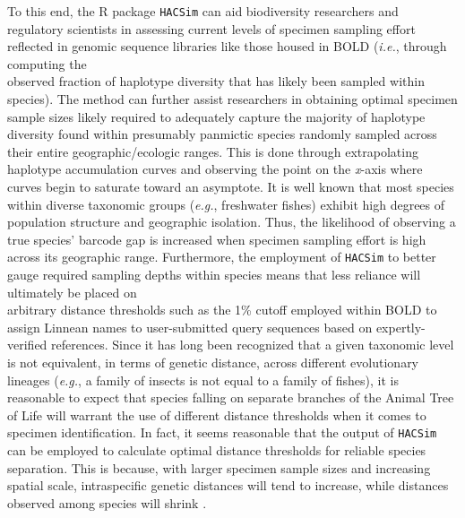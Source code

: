 To this end, the R package {\tt HACSim} \cite{phillips2020hacsim} can aid biodiversity researchers and \\ regulatory scientists in assessing current levels of specimen sampling effort reflected in genomic sequence libraries like those housed in BOLD (\textit{i.e.}, through computing the \\ observed fraction of haplotype diversity that has likely been sampled within species). The method can further assist researchers in obtaining optimal specimen sample sizes likely required to adequately capture the majority of haplotype diversity found within presumably panmictic species randomly sampled across their entire geographic/ecologic ranges. This is done through extrapolating haplotype accumulation curves and observing the point on the \textit{x}-axis where curves begin to saturate toward an asymptote. It is well known that most species within diverse taxonomic groups (\textit{e.g.}, freshwater fishes) exhibit high degrees of population structure and geographic isolation. Thus, the likelihood of observing a true species' barcode gap is increased when specimen sampling effort is high across its geographic range. Furthermore, the employment of {\tt HACSim} to better gauge required sampling depths within species means that less reliance will ultimately be placed on \\ arbitrary distance thresholds such as the 1\% cutoff employed within BOLD \cite{ratnasingham2007bold, ratnasingham2013dna} to assign Linnean names to user-submitted query sequences based on expertly-verified references. Since it has long been recognized that a given taxonomic level is not equivalent, in terms of genetic distance, across different evolutionary lineages (\textit{e.g.}, a family of insects is not equal to a family of fishes), it is reasonable to expect that species falling on separate branches of the Animal Tree of Life will warrant the use of different distance thresholds when it comes to specimen identification. In fact, it seems reasonable that the output of {\tt HACSim} can be employed to calculate optimal distance thresholds for reliable species separation. This is because, with larger specimen sample sizes and increasing spatial scale, intraspecific genetic distances will tend to increase, while distances observed among species will shrink \cite{bergsten2012effect, meyer2005dna}.



